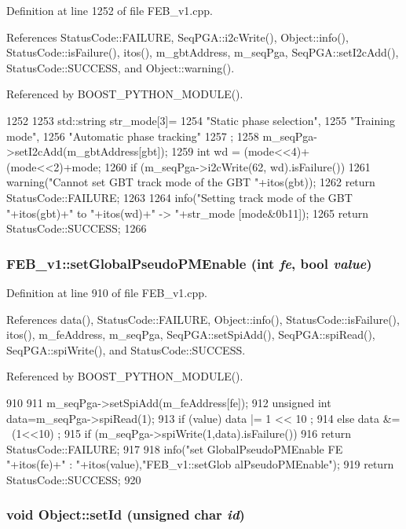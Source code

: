 Definition at line 1252 of file FEB\_\-v1.cpp.

References StatusCode::FAILURE, SeqPGA::i2cWrite(), Object::info(), StatusCode::isFailure(), itos(), m\_\-gbtAddress, m\_\-seqPga, SeqPGA::setI2cAdd(), StatusCode::SUCCESS, and Object::warning().

Referenced by BOOST\_\-PYTHON\_\-MODULE().


\begin{DoxyCode}
1252                                                    {
1253   std::string str_mode[3]={
1254     "Static phase selection",
1255     "Training mode",
1256     "Automatic phase tracking"
1257   };
1258   m_seqPga->setI2cAdd(m_gbtAddress[gbt]);
1259   int wd = (mode<<4)+(mode<<2)+mode;
1260   if (m_seqPga->i2cWrite(62, wd).isFailure()){
1261     warning("Cannot set GBT track mode of the GBT "+itos(gbt));
1262     return StatusCode::FAILURE;
1263   }
1264   info("Setting track mode of the GBT "+itos(gbt)+" to "+itos(wd)+" -> "+str_mode
      [mode&0b11]);
1265   return StatusCode::SUCCESS;
1266 }
\end{DoxyCode}
\hypertarget{classFEB__v1_adce2d9c70235f4226ab59aea3dc5953c}{
\subsubsection[{setGlobalPseudoPMEnable}]{ FEB\_\-v1::setGlobalPseudoPMEnable (int {\em fe}, \/  bool {\em value})}}
\label{classFEB__v1_adce2d9c70235f4226ab59aea3dc5953c}


Definition at line 910 of file FEB\_\-v1.cpp.

References data(), StatusCode::FAILURE, Object::info(), StatusCode::isFailure(), itos(), m\_\-feAddress, m\_\-seqPga, SeqPGA::setSpiAdd(), SeqPGA::spiRead(), SeqPGA::spiWrite(), and StatusCode::SUCCESS.

Referenced by BOOST\_\-PYTHON\_\-MODULE().


\begin{DoxyCode}
910                                                               {
911   m_seqPga->setSpiAdd(m_feAddress[fe]);
912   unsigned int data=m_seqPga->spiRead(1);
913   if (value)  data |= 1 << 10 ;
914   else        data &= ~(1<<10) ;
915   if (m_seqPga->spiWrite(1,data).isFailure()){
916     return StatusCode::FAILURE;
917   }
918   info("set GlobalPseudoPMEnable FE "+itos(fe)+" : "+itos(value),"FEB_v1::setGlob
      alPseudoPMEnable");
919   return StatusCode::SUCCESS;
920 }
\end{DoxyCode}
\hypertarget{classObject_a398fe08cba594a0ce6891d59fe4f159f}{
\subsubsection[{setId}]{\setlength{\rightskip}{0pt plus 5cm}void Object::setId (unsigned char {\em id})}}
\label{classObject_a398fe08cba594a0ce6891d59fe4f159f}


